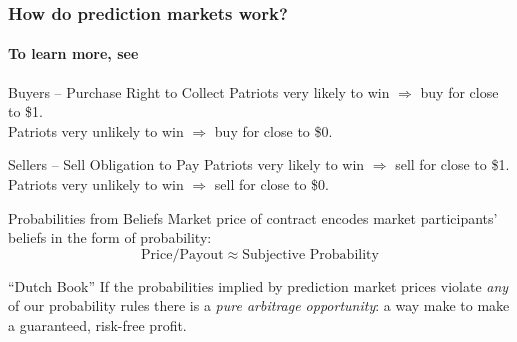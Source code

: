 \begin{frame}

\frametitle{How do prediction markets work?}
\framesubtitle{To learn more, see }
\begin{center}
\vspace{1em}

\begin{block}{Buyers -- Purchase Right to Collect}
Patriots very likely to win $\Rightarrow$ buy for close to \$1. \\ Patriots very unlikely to win $\Rightarrow$ buy for close to \$0.
\end{block}

\begin{block}{Sellers -- Sell Obligation to Pay} 
Patriots very likely to win $\Rightarrow$ sell for close to \$1. \\Patriots very unlikely to win $\Rightarrow$ sell for close to \$0.
\end{block}
\end{center}

\end{frame}
\begin{frame}

  \begin{block}{Probabilities from Beliefs}
    Market price of contract encodes market participants' beliefs in the form of probability:
$$\mbox{Price}/\mbox{Payout}\approx \mbox{Subjective Probability}$$
  \end{block} \pause

	\begin{alertblock}{``Dutch Book''}
    If the probabilities implied by prediction market prices violate \emph{any} of our probability rules there is a \emph{pure arbitrage opportunity}: a way make to make a guaranteed, risk-free profit.
	\end{alertblock} \pause

\end{frame}

